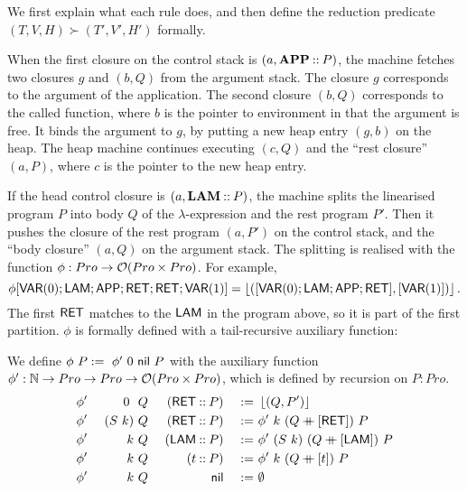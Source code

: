 We first explain what each rule does, and then define the reduction predicate\\$(T,V,H) \succ (T',V',H')$ formally.


When the first closure on the control stack is $(a, \mathsf{\textbf{APP}} \mathbin{::} P)$, the machine fetches two closures $g$ and
$(b,Q)$ from the argument stack.  The closure $g$ corresponds to the argument of the application.  The second closure
$(b,Q)$ corresponds to the called function, where $b$ is the pointer to environment in that the argument is free.  It binds the argument to
$g$, by putting a new heap entry $(g,b)$ on the heap.  The heap machine continues executing $(c,Q)$ and the ``rest closure'' $(a,P)$, where
$c$ is the pointer to the new heap entry.


If the head control closure is $(a, \mathsf{\mathbf{LAM}} \mathbin{::} P)$, the machine splits the linearised program $P$ into body $Q$ of the
$\lambda$-expression and the rest program $P'$.  Then it pushes the closure of the rest program $(a,P')$ on the control stack, and the ``body
closure'' $(a,Q)$ on the argument stack.  The splitting is realised with the function $\phi : Pro \rightarrow \mathcal{O}(Pro \times Pro)$.  For example, {\small
  \[
    \phi[\mathsf{VAR}(0); \mathsf{LAM}; \mathsf{APP}; \mathsf{RET}; \mathsf{RET}; \mathsf{VAR}(1)] = \left\lfloor {([\ensuremath{\mathsf{VAR}}(0); \ensuremath{\mathsf{LAM}}; \ensuremath{\mathsf{APP}}; \ensuremath{\mathsf{RET}}], [\ensuremath{\mathsf{VAR}}(1)])} \right\rfloor.
  \]
}%
The first $\mathsf{RET}$ matches to the $\mathsf{LAM}$ in the program above, so it is part of the first partition.  $\phi$ is formally defined with a
tail-recursive auxiliary function:
\begin{definition}[$\phi$]
  \label{def:jumpTarget}
  We define $\phi~P :=~ \phi'~0~\mathsf{nil}~P$ with the auxiliary function $\phi' : \mathbb{N} \rightarrow Pro \rightarrow Pro \rightarrow \mathcal{O}(Pro \times Pro)$, which is defined by
  recursion on $P:Pro$.
  \begin{alignat*}{4}
    &\phi'&~0~   &~Q&~(\mathsf{RET} \mathbin{::} P) &&~:=~& \left\lfloor {(Q,P')} \right\rfloor \\
    &\phi'&~(S~k)&~Q&~(\mathsf{RET} \mathbin{::} P) &&~:=~& \phi'~k~(Q \mathbin{+\mkern-10mu+} [\mathsf{RET}])~P \\
    &\phi'&~k    &~Q&~(\mathsf{LAM} \mathbin{::} P) &&~:=~& \phi'~(S~k)~(Q \mathbin{+\mkern-10mu+} [\mathsf{LAM}])~P \\
    &\phi'&~k    &~Q&~(t        \mathbin{::} P) &&~:=~& \phi'~k~(Q \mathbin{+\mkern-10mu+} [t])~P \\
    &\phi'&~k    &~Q&~              \mathsf{nil} &&~:=~& \emptyset
  \end{alignat*}
\end{definition}


